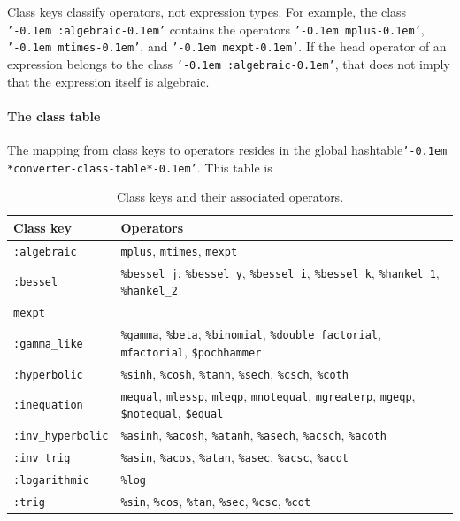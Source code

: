 \documentclass[12pt,fleqn]{extarticle}
\newcommand{\ttq}[1]{\texttt{'\kern-0.1em #1\kern-0.1em'}}
\begin{document}
Class keys classify operators, not expression types. For example, the class
\ttq{:algebraic} contains the operators \ttq{mplus}, \ttq{mtimes}, and \ttq{mexpt}.
If the head operator of an expression belongs to the class \ttq{:algebraic}, that does not imply that the expression itself is algebraic.

\paragraph{The class table} The mapping from class keys to operators resides in the 
global  hashtable\ttq{*converter-class-table*}. This table is 


\begin{table}[h]
\centering
\begin{tabular}{ll}
\toprule
\textbf{Class key} & \textbf{Operators} \\
\midrule

\texttt{:algebraic} &
\texttt{mplus}, \texttt{mtimes}, \texttt{mexpt} \\[2pt]

\texttt{:bessel} &
\texttt{\%bessel\_j}, \texttt{\%bessel\_y}, \texttt{\%bessel\_i},
\texttt{\%bessel\_k}, \texttt{\%hankel\_1}, \texttt{\%hankel\_2} \\[2pt]

\texttt{mexpt} \\[2pt]

\texttt{:gamma\_like} &
\texttt{\%gamma}, \texttt{\%beta}, \texttt{\%binomial},
\texttt{\%double\_factorial}, \texttt{mfactorial},
\texttt{\$pochhammer} \\[2pt]

\texttt{:hyperbolic} &
\texttt{\%sinh}, \texttt{\%cosh}, \texttt{\%tanh},
\texttt{\%sech}, \texttt{\%csch}, \texttt{\%coth} \\[2pt]

\texttt{:inequation} &
\texttt{mequal}, \texttt{mlessp}, \texttt{mleqp}, \texttt{mnotequal},
\texttt{mgreaterp}, \texttt{mgeqp}, \texttt{\$notequal}, \texttt{\$equal} \\[2pt]

\texttt{:inv\_hyperbolic} &
\texttt{\%asinh}, \texttt{\%acosh}, \texttt{\%atanh},
\texttt{\%asech}, \texttt{\%acsch}, \texttt{\%acoth} \\[2pt]

\texttt{:inv\_trig} &
\texttt{\%asin}, \texttt{\%acos}, \texttt{\%atan},
\texttt{\%asec}, \texttt{\%acsc}, \texttt{\%acot} \\[2pt]

\texttt{:logarithmic} &
\texttt{\%log} \\[2pt]

\texttt{:trig} &
\texttt{\%sin}, \texttt{\%cos}, \texttt{\%tan},
\texttt{\%sec}, \texttt{\%csc}, \texttt{\%cot} \\

\bottomrule
\end{tabular}
\caption{Class keys and their associated operators.}
\end{table}
\end{document}
